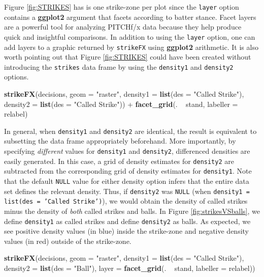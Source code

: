 \documentclass[12pt,]{isuthesis}
\newenvironment{Shaded}{\begin{snugshade}}{\end{snugshade}}
\newcommand{\KeywordTok}[1]{\textcolor[rgb]{0.13,0.29,0.53}{\textbf{{#1}}}}
\newcommand{\DataTypeTok}[1]{\textcolor[rgb]{0.13,0.29,0.53}{{#1}}}
\newcommand{\StringTok}[1]{\textcolor[rgb]{0.31,0.60,0.02}{{#1}}}
\newcommand{\NormalTok}[1]{{#1}}
\begin{document}
Figure \ref{fig:STRIKES} has is one strike-zone per plot since the
\texttt{layer} option contains a \textbf{ggplot2} argument that facets
according to batter stance. Facet layers are a powerful tool for
analyzing PITCHf/x data because they help produce quick and insightful
comparisons. In addition to using the \texttt{layer} option, one can add
layers to a graphic returned by \texttt{strikeFX} using \textbf{ggplot2}
arithmetic. It is also worth pointing out that Figure \ref{fig:STRIKES}
could have been created without introducing the \texttt{strikes} data
frame by using the \texttt{density1} and \texttt{density2} options.

\begin{Shaded}
\begin{Highlighting}[]
\KeywordTok{strikeFX}\NormalTok{(decisions, }\DataTypeTok{geom =} \StringTok{"raster"}\NormalTok{, }\DataTypeTok{density1 =} \KeywordTok{list}\NormalTok{(}\DataTypeTok{des =} \StringTok{"Called Strike"}\NormalTok{),          }
  \DataTypeTok{density2 =} \KeywordTok{list}\NormalTok{(}\DataTypeTok{des =} \StringTok{"Called Strike"}\NormalTok{)) +}\StringTok{ }\KeywordTok{facet_grid}\NormalTok{(. ~}\StringTok{ }\NormalTok{stand, }\DataTypeTok{labeller =} \NormalTok{relabel)}
\end{Highlighting}
\end{Shaded}

In general, when \texttt{density1} and \texttt{density2} are identical,
the result is equivalent to subsetting the data frame appropriately
beforehand. More importantly, by specifying \emph{different} values for
\texttt{density1} and \texttt{density2}, differenced densities are
easily generated. In this case, a grid of density estimates for
\texttt{density2} are subtracted from the corresponding grid of density
estimates for \texttt{density1}. Note that the default \texttt{NULL}
value for either density option infers that the entire data set defines
the relevant density. Thus, if \texttt{density2} was \texttt{NULL} (when
\texttt{density1 = list(des = 'Called Strike')}), we would obtain the
density of called strikes minus the density of \emph{both} called
strikes and balls. In Figure \ref{fig:strikesVSballs}, we define
\texttt{density1} as called strikes and define \texttt{density2} as
balls. As expected, we see positive density values (in blue) inside the
strike-zone and negative density values (in red) outside of the
strike-zone.

\begin{Shaded}
\begin{Highlighting}[]
\KeywordTok{strikeFX}\NormalTok{(decisions, }\DataTypeTok{geom =} \StringTok{"raster"}\NormalTok{, }\DataTypeTok{density1 =} \KeywordTok{list}\NormalTok{(}\DataTypeTok{des =} \StringTok{"Called Strike"}\NormalTok{), }
  \DataTypeTok{density2 =} \KeywordTok{list}\NormalTok{(}\DataTypeTok{des =} \StringTok{"Ball"}\NormalTok{), }\DataTypeTok{layer =} \KeywordTok{facet_grid}\NormalTok{(. ~}\StringTok{ }\NormalTok{stand, }\DataTypeTok{labeller =} \NormalTok{relabel)) }
\end{Highlighting}
\end{Shaded}
\end{document}
